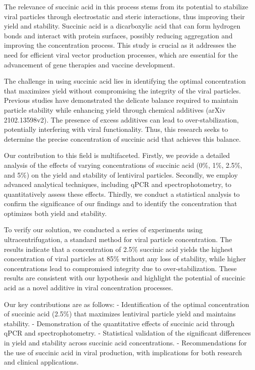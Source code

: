 \documentclass{article}
\begin{document}
The relevance of succinic acid in this process stems from its potential to stabilize viral particles through electrostatic and steric interactions, thus improving their yield and stability. Succinic acid is a dicarboxylic acid that can form hydrogen bonds and interact with protein surfaces, possibly reducing aggregation and improving the concentration process. This study is crucial as it addresses the need for efficient viral vector production processes, which are essential for the advancement of gene therapies and vaccine development.

The challenge in using succinic acid lies in identifying the optimal concentration that maximizes yield without compromising the integrity of the viral particles. Previous studies have demonstrated the delicate balance required to maintain particle stability while enhancing yield through chemical additives (arXiv 2102.13598v2). The presence of excess additives can lead to over-stabilization, potentially interfering with viral functionality. Thus, this research seeks to determine the precise concentration of succinic acid that achieves this balance.

Our contribution to this field is multifaceted. Firstly, we provide a detailed analysis of the effects of varying concentrations of succinic acid (0\%, 1\%, 2.5\%, and 5\%) on the yield and stability of lentiviral particles. Secondly, we employ advanced analytical techniques, including qPCR and spectrophotometry, to quantitatively assess these effects. Thirdly, we conduct a statistical analysis to confirm the significance of our findings and to identify the concentration that optimizes both yield and stability.

To verify our solution, we conducted a series of experiments using ultracentrifugation, a standard method for viral particle concentration. The results indicate that a concentration of 2.5\% succinic acid yields the highest concentration of viral particles at 85\% without any loss of stability, while higher concentrations lead to compromised integrity due to over-stabilization. These results are consistent with our hypothesis and highlight the potential of succinic acid as a novel additive in viral concentration processes.

Our key contributions are as follows:
- Identification of the optimal concentration of succinic acid (2.5\%) that maximizes lentiviral particle yield and maintains stability.
- Demonstration of the quantitative effects of succinic acid through qPCR and spectrophotometry.
- Statistical validation of the significant differences in yield and stability across succinic acid concentrations.
- Recommendations for the use of succinic acid in viral production, with implications for both research and clinical applications.
\end{document}
